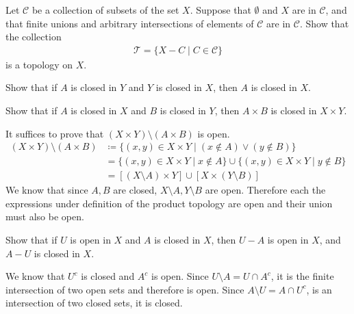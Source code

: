   \begin{exercise}[Munkres 17.1]
    Let $\mathcal{C}$ be a collection of subsets of the set $X$. Suppose that $\emptyset$ and $X$ are in $\mathcal{C}$, and that finite unions and arbitrary intersections of elements of $\mathcal{C}$ are in $\mathcal{C}$. Show that the collection
    \begin{align*}
      \mathcal{T} = \{X - C \mid C \in \mathcal{C}\}
    \end{align*}
    is a topology on $X$.
  \end{exercise}
  \begin{solution}
    
  \end{solution}

  \begin{exercise}[Munkres 17.2]
    Show that if $A$ is closed in $Y$ and $Y$ is closed in $X$, then $A$ is closed in $X$.
  \end{exercise}
  \begin{solution}
    
  \end{solution}

  \begin{exercise}[Munkres 17.3]
    Show that if $A$ is closed in $X$ and $B$ is closed in $Y$, then $A \times B$ is closed in $X \times Y$.
  \end{exercise}
  \begin{solution} 
    It suffices to prove that $(X \times Y) \setminus (A \times B)$ is open. 
    \begin{align}
      (X \times Y) \setminus (A \times B) & \coloneqq \{ (x, y) \in X \times Y \mid (x \not\in A) \lor (y \not\in B) \} \\
                                          & = \{(x, y) \in X \times Y \mid x \not\in A \} \cup \{(x, y) \in X \times Y \mid y \not\in B \} \\
                                          & = [(X \setminus A) \times Y] \cup [X \times (Y \setminus B)]
    \end{align}
    We know that since $A, B$ are closed, $X \setminus A, Y \setminus B$ are open. Therefore each the expressions under definition of the product topology are open and their union must also be open. 
  \end{solution}

  \begin{exercise}[Munkres 17.4]
    Show that if $U$ is open in $X$ and $A$ is closed in $X$, then $U - A$ is open in $X$, and $A - U$ is closed in $X$.
  \end{exercise}
  \begin{solution}
    We know that $U^c$ is closed and $A^c$ is open. Since $U \setminus A = U \cap A^c$, it is the finite intersection of two open sets and therefore is open. Since $A \setminus U = A \cap U^c$, is an intersection of two closed sets, it is closed. 
  \end{solution}

